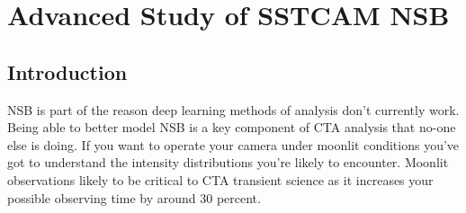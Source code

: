 \chapter{\label{ch:5-CHECNSB} Advanced Study of SSTCAM NSB}
\minitoc
\section{Introduction}
NSB is part of the reason deep learning methods of analysis don't currently work. Being able to better model NSB is a key component of CTA analysis that no-one else is doing. If you want to operate your camera under moonlit conditions you've got to understand the intensity distributions you're likely to encounter. Moonlit observations likely to be critical to CTA transient science as it increases your possible observing time by around 30 percent.